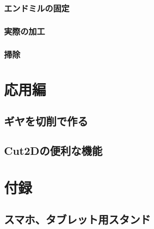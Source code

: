 \documentclass[b5paper, 9pt, twocolumn, titlepage,openany]{jsbook}%
\begin{document}
\subsection{エンドミルの固定}
\subsection{実際の加工}
\subsection{掃除}

\chapter{応用編}
\section{ギヤを切削で作る }
\section{Cut2Dの便利な機能}

\chapter{付録}
\section{スマホ、タブレット用スタンド}



\end{document}
